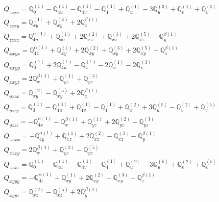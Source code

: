 \documentclass[fleqn,8pt,landscape]{jsarticle}
\begin{document}
\begin{align*}
& Q_{zzxx} = \mathbb{Q}_{0}^{(1)} - \mathbb{Q}_{4u}^{(1)} - \mathbb{Q}_{4v}^{(1)} - \mathbb{Q}_{4}^{(1)} + \mathbb{Q}_{u}^{(1)} - 3 \mathbb{Q}_{u}^{(3)} + \mathbb{Q}_{v}^{(1)} + \mathbb{Q}_{v}^{(3)} \\
& Q_{zzxy} = \mathbb{Q}_{xy}^{(1)} + \mathbb{Q}_{xy}^{(3)} + 2 \mathbb{Q}_{z}^{\beta(1)} \\
& Q_{zzxz} = \mathbb{Q}_{4y}^{\alpha(1)} + \mathbb{Q}_{xz}^{(1)} + 2 \mathbb{Q}_{xz}^{(2)} + \mathbb{Q}_{xz}^{(3)} + 2 \mathbb{Q}_{xz}^{(5)} - \mathbb{Q}_{y}^{\beta(1)} \\
& Q_{xxyx} = \mathbb{Q}_{4z}^{\alpha(1)} + \mathbb{Q}_{xy}^{(1)} + 2 \mathbb{Q}_{xy}^{(2)} + \mathbb{Q}_{xy}^{(3)} + 2 \mathbb{Q}_{xy}^{(5)} - \mathbb{Q}_{z}^{\beta(1)} \\
& Q_{xxyy} = \mathbb{Q}_{0}^{(1)} + 2 \mathbb{Q}_{4u}^{(1)} - \mathbb{Q}_{4}^{(1)} - 2 \mathbb{Q}_{u}^{(1)} - 2 \mathbb{Q}_{v}^{(3)} \\
& Q_{xxyz} = 2 \mathbb{Q}_{x}^{\beta(1)} + \mathbb{Q}_{yz}^{(1)} + \mathbb{Q}_{yz}^{(3)} \\
& Q_{yzzx} = \mathbb{Q}_{xy}^{(2)} - \mathbb{Q}_{xy}^{(5)} + 2 \mathbb{Q}_{z}^{\beta(1)} \\
& Q_{yzzy} = \mathbb{Q}_{0}^{(1)} - \mathbb{Q}_{4u}^{(1)} + \mathbb{Q}_{4v}^{(1)} - \mathbb{Q}_{4}^{(1)} + \mathbb{Q}_{u}^{(2)} + 3 \mathbb{Q}_{u}^{(5)} - \mathbb{Q}_{v}^{(2)} + \mathbb{Q}_{v}^{(5)} \\
& Q_{yzzz} = - \mathbb{Q}_{4x}^{\alpha(1)} - \mathbb{Q}_{x}^{\beta(1)} + \mathbb{Q}_{yz}^{(1)} + 2 \mathbb{Q}_{yz}^{(2)} - \mathbb{Q}_{yz}^{(3)} \\
& Q_{zxxx} = - \mathbb{Q}_{4y}^{\alpha(1)} + \mathbb{Q}_{xz}^{(1)} + 2 \mathbb{Q}_{xz}^{(2)} - \mathbb{Q}_{xz}^{(3)} - \mathbb{Q}_{y}^{\beta(1)} \\
& Q_{zxxy} = 2 \mathbb{Q}_{x}^{\beta(1)} + \mathbb{Q}_{yz}^{(2)} - \mathbb{Q}_{yz}^{(5)} \\
& Q_{zxxz} = \mathbb{Q}_{0}^{(1)} - \mathbb{Q}_{4u}^{(1)} - \mathbb{Q}_{4v}^{(1)} - \mathbb{Q}_{4}^{(1)} + \mathbb{Q}_{u}^{(2)} - 3 \mathbb{Q}_{u}^{(5)} + \mathbb{Q}_{v}^{(2)} + \mathbb{Q}_{v}^{(5)} \\
& Q_{xyyy} = - \mathbb{Q}_{4z}^{\alpha(1)} + \mathbb{Q}_{xy}^{(1)} + 2 \mathbb{Q}_{xy}^{(2)} - \mathbb{Q}_{xy}^{(3)} - \mathbb{Q}_{z}^{\beta(1)} \\
& Q_{xyyz} = \mathbb{Q}_{xz}^{(2)} - \mathbb{Q}_{xz}^{(5)} + 2 \mathbb{Q}_{y}^{\beta(1)}
\end{align*}
\end{document}
